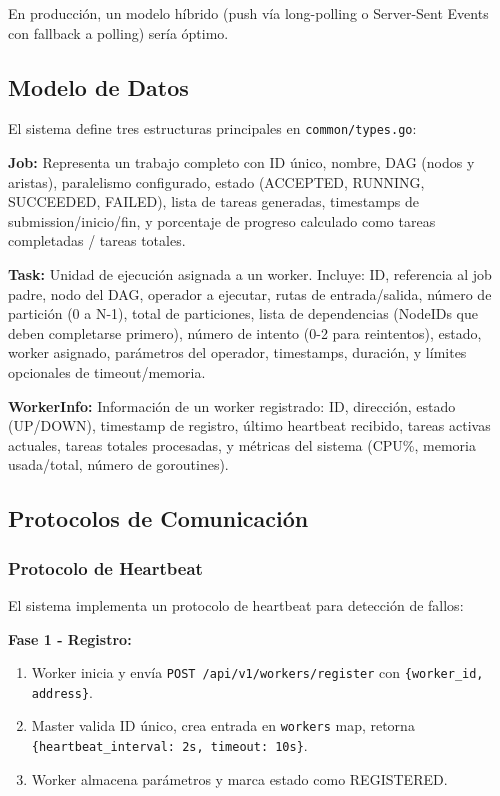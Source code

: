 \documentclass[conference]{IEEEtran}
\begin{document}
En producción, un modelo híbrido (push vía long-polling o Server-Sent Events con fallback a polling) sería óptimo.

\subsection{Modelo de Datos}

El sistema define tres estructuras principales en \texttt{common/types.go}:

\textbf{Job:} Representa un trabajo completo con ID único, nombre, DAG (nodos y aristas), paralelismo configurado, estado (ACCEPTED, RUNNING, SUCCEEDED, FAILED), lista de tareas generadas, timestamps de submission/inicio/fin, y porcentaje de progreso calculado como tareas completadas / tareas totales.

\textbf{Task:} Unidad de ejecución asignada a un worker. Incluye: ID, referencia al job padre, nodo del DAG, operador a ejecutar, rutas de entrada/salida, número de partición (0 a N-1), total de particiones, lista de dependencias (NodeIDs que deben completarse primero), número de intento (0-2 para reintentos), estado, worker asignado, parámetros del operador, timestamps, duración, y límites opcionales de timeout/memoria.

\textbf{WorkerInfo:} Información de un worker registrado: ID, dirección, estado (UP/DOWN), timestamp de registro, último heartbeat recibido, tareas activas actuales, tareas totales procesadas, y métricas del sistema (CPU\%, memoria usada/total, número de goroutines).

\subsection{Protocolos de Comunicación}

\subsubsection{Protocolo de Heartbeat}

El sistema implementa un protocolo de heartbeat para detección de fallos:

\textbf{Fase 1 - Registro:}
\begin{enumerate}
\item Worker inicia y envía \texttt{POST /api/v1/workers/register} con \texttt{\{worker\_id, address\}}.
\item Master valida ID único, crea entrada en \texttt{workers} map, retorna \texttt{\{heartbeat\_interval: 2s, timeout: 10s\}}.
\item Worker almacena parámetros y marca estado como REGISTERED.
\end{enumerate}
\end{document}

